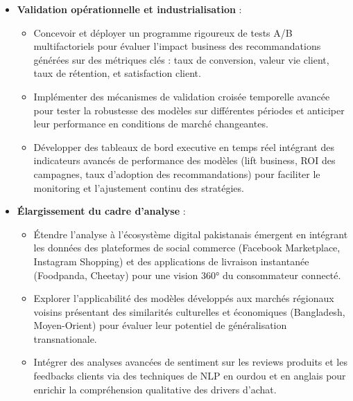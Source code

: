\documentclass[a4paper,12pt]{article}
\begin{document}
\begin{itemize}
\begin{itemize}
        \item Adopter des techniques de \textbf{reinforcement learning} pour optimiser dynamiquement les stratégies de cross-selling et d'upselling en fonction des retours clients en temps réel.
    \end{itemize}
    
    \item \textbf{Validation opérationnelle et industrialisation} :
    \begin{itemize}
        \item Concevoir et déployer un programme rigoureux de tests A/B multifactoriels pour évaluer l'impact business des recommandations générées sur des métriques clés : taux de conversion, valeur vie client, taux de rétention, et satisfaction client.
        
        \item Implémenter des mécanismes de validation croisée temporelle avancée pour tester la robustesse des modèles sur différentes périodes et anticiper leur performance en conditions de marché changeantes.
        
        \item Développer des tableaux de bord executive en temps réel intégrant des indicateurs avancés de performance des modèles (lift business, ROI des campagnes, taux d'adoption des recommandations) pour faciliter le monitoring et l'ajustement continu des stratégies.
    \end{itemize}
    
    \item \textbf{Élargissement du cadre d'analyse} :
    \begin{itemize}
        \item Étendre l'analyse à l'écosystème digital pakistanais émergent en intégrant les données des plateformes de social commerce (Facebook Marketplace, Instagram Shopping) et des applications de livraison instantanée (Foodpanda, Cheetay) pour une vision 360° du consommateur connecté.
        
        \item Explorer l'applicabilité des modèles développés aux marchés régionaux voisins présentant des similarités culturelles et économiques (Bangladesh, Moyen-Orient) pour évaluer leur potentiel de généralisation transnationale.
        
        \item Intégrer des analyses avancées de sentiment sur les reviews produits et les feedbacks clients via des techniques de NLP en ourdou et en anglais pour enrichir la compréhension qualitative des drivers d'achat.
    \end{itemize}
\end{itemize}
\end{document}
